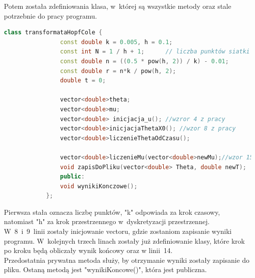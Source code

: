 \documentclass[a4paper,11pt]{article}
\begin{document}
	Potem została zdefiniowania klasa, w~której są wszystkie metody oraz stale potrzebnie do pracy programu.
			\begin{lstlisting}[caption={klasa tranformataHopfCofe},label={klasa}, language=C++]
			class transformataHopfCole {
				const double k = 0.005, h = 0.1;
                const int N = 1 / h + 1;      // liczba punktów siatki
				const double n = ((0.5 * pow(h, 2)) / k) - 0.01;
				const double r = n*k / pow(h, 2);
				double t = 0;
				
				vector<double>theta;
				vector<double>mu;
				vector<double> inicjacja_u(); //wzror 4 z pracy
				vector<double>inicjacjaThetaX0(); //wzor 8 z pracy
				vector<double>liczenieThetaOdCzasu();
				
				vector<double>liczenieMu(vector<double>newMu);//wzor 15
				void zapisDoPliku(vector<double> Theta, double newT);
				public:
				void wynikiKonczowe();
			};\end{lstlisting}
		Pierwsza stała oznacza liczbę punktów, "k" odpowiada za krok czasowy, natomiast "h" za krok przestrzennego w~dyskretyzacji przestrzennej.\\
		W~8~i~9~linii zostały inicjowanie vectoru, gdzie zostaniom zapisanie wyniki programu. W~kolejnych trzech linach zostały już zdefiniowanie klasy, które krok po kroku będą obliczały wynik końcowy oraz w linii~14.\\
		Przedostatnia prywatna metoda służy, by otrzymanie wyniki zostały zapisanie do pliku. Ostaną metodą jest "wynikiKoncowe()", która jest publiczna. 
\end{document}
